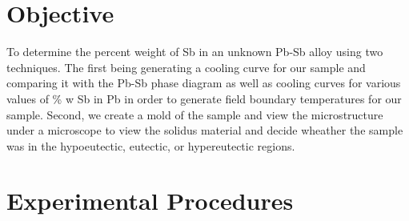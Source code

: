 \documentclass{article}
\begin{document}



\section{Objective}

To determine the percent weight of Sb in an unknown Pb-Sb alloy using two techniques. The first being generating a cooling curve for our sample and comparing it with the Pb-Sb phase diagram as well as cooling curves for various values of \% w Sb in Pb in order to generate field boundary temperatures for our sample. Second, we create a mold of the sample and view the microstructure under a microscope to view the solidus material and decide wheather the sample was in the hypoeutectic, eutectic, or hypereutectic regions.



\section{Experimental Procedures}
\end{document}
